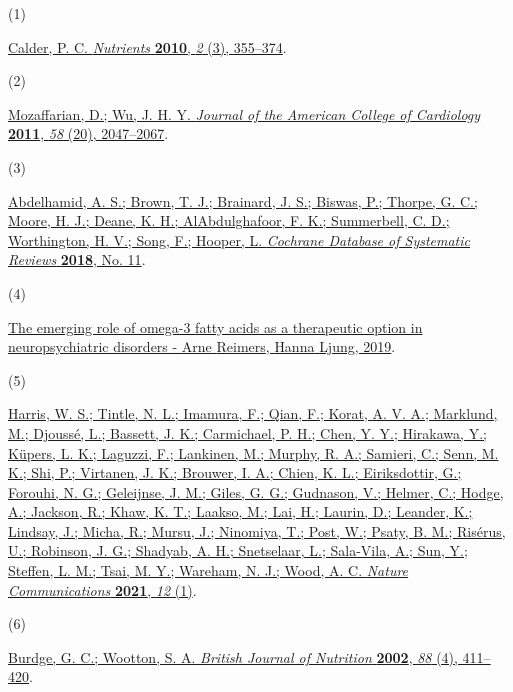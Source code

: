\documentclass[journal=jacsat,manuscript=article]{achemso}
\newlength{\cslhangindent}
\newlength{\csllabelwidth}
\newenvironment{CSLReferences}[2] %
 {\begin{list}{}{%
  \setlength{\itemindent}{0pt}
  \setlength{\leftmargin}{0pt}
  \setlength{\parsep}{0pt}
  \ifodd #1
   \setlength{\leftmargin}{\cslhangindent}
   \setlength{\itemindent}{-1\cslhangindent}
  \fi
  \setlength{\itemsep}{#2\baselineskip}}}
 {\end{list}}
\newcommand{\CSLLeftMargin}[1]{\parbox[t]{\csllabelwidth}{#1}}
\newcommand{\CSLRightInline}[1]{\parbox[t]{\linewidth - \csllabelwidth}{#1}\break}
\begin{document}
\label{refs}
\begin{CSLReferences}{0}{0}
\CSLLeftMargin{(1) }%
\CSLRightInline{\href{https://doi.org/10.3390/nu2030355}{Calder, P. C.
\emph{Nutrients} \textbf{2010}, \emph{2} (3), 355--374}.}

\CSLLeftMargin{(2) }%
\CSLRightInline{\href{https://doi.org/10.1016/j.jacc.2011.06.063}{Mozaffarian,
D.; Wu, J. H. Y. \emph{Journal of the American College of Cardiology}
\textbf{2011}, \emph{58} (20), 2047--2067}.}

\CSLLeftMargin{(3) }%
\CSLRightInline{\href{https://doi.org/10.1002/14651858.CD003177.pub4}{Abdelhamid,
A. S.; Brown, T. J.; Brainard, J. S.; Biswas, P.; Thorpe, G. C.; Moore,
H. J.; Deane, K. H.; AlAbdulghafoor, F. K.; Summerbell, C. D.;
Worthington, H. V.; Song, F.; Hooper, L. \emph{Cochrane Database of
Systematic Reviews} \textbf{2018}, No. 11}.}

\CSLLeftMargin{(4) }%
\CSLRightInline{\href{https://journals.sagepub.com/doi/full/10.1177/2045125319858901}{The
emerging role of omega-3 fatty acids as a therapeutic option in
neuropsychiatric disorders - {Arne} {Reimers}, {Hanna} {Ljung}, 2019}.}

\CSLLeftMargin{(5) }%
\CSLRightInline{\href{https://doi.org/10.1038/s41467-021-22370-2}{Harris,
W. S.; Tintle, N. L.; Imamura, F.; Qian, F.; Korat, A. V. A.; Marklund,
M.; Djoussé, L.; Bassett, J. K.; Carmichael, P. H.; Chen, Y. Y.;
Hirakawa, Y.; Küpers, L. K.; Laguzzi, F.; Lankinen, M.; Murphy, R. A.;
Samieri, C.; Senn, M. K.; Shi, P.; Virtanen, J. K.; Brouwer, I. A.;
Chien, K. L.; Eiriksdottir, G.; Forouhi, N. G.; Geleijnse, J. M.; Giles,
G. G.; Gudnason, V.; Helmer, C.; Hodge, A.; Jackson, R.; Khaw, K. T.;
Laakso, M.; Lai, H.; Laurin, D.; Leander, K.; Lindsay, J.; Micha, R.;
Mursu, J.; Ninomiya, T.; Post, W.; Psaty, B. M.; Risérus, U.; Robinson,
J. G.; Shadyab, A. H.; Snetselaar, L.; Sala-Vila, A.; Sun, Y.; Steffen,
L. M.; Tsai, M. Y.; Wareham, N. J.; Wood, A. C. \emph{Nature
Communications} \textbf{2021}, \emph{12} (1)}.}

\CSLLeftMargin{(6) }%
\CSLRightInline{\href{https://doi.org/10.1079/BJN2002689}{Burdge, G. C.;
Wootton, S. A. \emph{British Journal of Nutrition} \textbf{2002},
\emph{88} (4), 411--420}.}


\end{CSLReferences}
\end{document}
